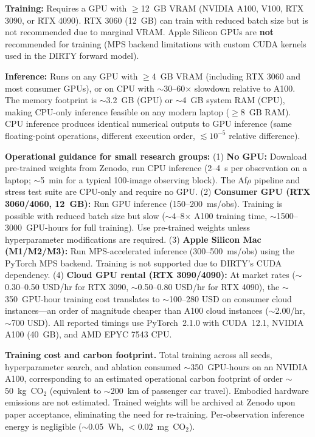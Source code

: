 \documentclass[usenatbib]{mnras}
\begin{document}
\textbf{Training:} Requires a GPU with $\geq$12~GB VRAM (NVIDIA A100, V100, RTX 3090, or RTX 4090). RTX 3060 (12~GB) can train with reduced batch size but is not recommended due to marginal VRAM. Apple Silicon GPUs are \textbf{not} recommended for training (MPS backend limitations with custom CUDA kernels used in the DIRTY forward model).

\textbf{Inference:} Runs on any GPU with $\geq$4~GB VRAM (including RTX 3060 and most consumer GPUs), or on CPU with $\sim$30--60$\times$ slowdown relative to A100. The memory footprint is $\sim$3.2~GB (GPU) or $\sim$4~GB system RAM (CPU), making CPU-only inference feasible on any modern laptop ($\geq$8~GB RAM). CPU inference produces identical numerical outputs to GPU inference (same floating-point operations, different execution order, $\lesssim 10^{-5}$ relative difference).

\textbf{Operational guidance for small research groups:} (1) \textbf{No GPU:} Download pre-trained weights from Zenodo, run CPU inference (2--4~s per observation on a laptop; $\sim$5~min for a typical 100-image observing block). The Af$\rho$ pipeline and stress test suite are CPU-only and require no GPU. (2) \textbf{Consumer GPU (RTX 3060/4060, 12~GB):} Run GPU inference (150--200~ms/obs). Training is possible with reduced batch size but slow ($\sim$4--8$\times$ A100 training time, $\sim$1500--3000~GPU-hours for full training). Use pre-trained weights unless hyperparameter modifications are required. (3) \textbf{Apple Silicon Mac (M1/M2/M3):} Run MPS-accelerated inference (300--500~ms/obs) using the PyTorch MPS backend. Training is not supported due to DIRTY's CUDA dependency. (4) \textbf{Cloud GPU rental (RTX 3090/4090):} At market rates ($\sim$0.30--0.50 USD/hr for RTX 3090, $\sim$0.50--0.80 USD/hr for RTX 4090), the $\sim$350~GPU-hour training cost translates to $\sim$100--280 USD on consumer cloud instances---an order of magnitude cheaper than A100 cloud instances ($\sim$2.00/hr, $\sim$700 USD). All reported timings use PyTorch~2.1.0 with CUDA~12.1, NVIDIA A100 (40~GB), and AMD EPYC 7543 CPU.

\textbf{Training cost and carbon footprint.} Total training across all seeds, hyperparameter search, and ablation consumed $\sim$350~GPU-hours on an NVIDIA A100, corresponding to an estimated operational carbon footprint of order $\sim$50~kg~CO$_2$ (equivalent to $\sim$200~km of passenger car travel). Embodied hardware emissions are not estimated. Trained weights will be archived at Zenodo upon paper acceptance, eliminating the need for re-training. Per-observation inference energy is negligible ($\sim$0.05~Wh, $<0.02$~mg~CO$_2$).
\end{document}
